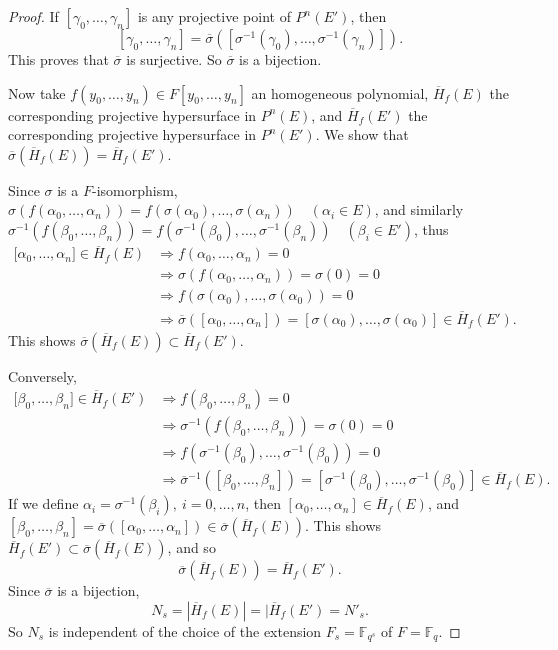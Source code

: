 \documentclass[11pt,a4paper]{article}
\newcommand{\F}{\mathbb{F}}
\begin{document}
\begin{proof}
 If $[\gamma_0,\ldots,\gamma_n] $ is any projective point of $P^n(E')$, then 
 $$[\gamma_0,\ldots,\gamma_n] = \overline{\sigma}([\sigma^{-1}(\gamma_0),\ldots,\sigma^{-1}(\gamma_n)]).$$ This proves that $\overline{\sigma}$ is surjective. So $\overline{\sigma}$ is a bijection.
 
 Now take $f(y_0,\ldots,y_n)\in F[y_0,\ldots,y_n]$ an homogeneous polynomial, $\overline{H}_f(E)$ the corresponding projective hypersurface in $P^n(E)$, and $\overline{H}_f(E')$  the corresponding projective hypersurface in $P^n(E')$. We show that $\overline{\sigma}(\overline{H}_f(E)) = \overline{H}_f(E')$.
 
 Since $\sigma$ is a $F$-isomorphism, $\sigma(f(\alpha_0,\ldots,\alpha_n)) = f(\sigma(\alpha_0),\ldots,\sigma(\alpha_n))\quad (\alpha_i \in E)$, and similarly $\sigma^{-1}(f(\beta_0,\ldots,\beta_n)) = f(\sigma^{-1} (\beta_0),\ldots, \sigma^{-1}(\beta_n))\quad  (\beta_i \in E')$, thus
 \begin{align*}
 {[}\alpha_0,\ldots,\alpha_n{]} \in  \overline{H}_f(E)
 &\Rightarrow f(\alpha_0,\ldots,\alpha_n) = 0 \\
 &\Rightarrow \sigma(f(\alpha_0,\ldots,\alpha_n)) = \sigma(0) = 0\\
 & \Rightarrow f(\sigma(\alpha_0),\ldots,\sigma(\alpha_0)) = 0\\
 &\Rightarrow \overline{\sigma}([\alpha_0,\ldots,\alpha_n]) = [\sigma(\alpha_0),\ldots,\sigma(\alpha_0)] \in \overline{H}_f(E').
\end{align*}
This shows $\overline{\sigma}(\overline{H}_f(E)) \subset \overline{H}_f(E')$.

Conversely, 
 \begin{align*}
 {[}\beta_0,\ldots,\beta_n{]} \in  \overline{H}_f(E')
 &\Rightarrow f(\beta_0,\ldots,\beta_n) = 0 \\
 &\Rightarrow \sigma^{-1}(f(\beta_0,\ldots,\beta_n)) = \sigma(0) = 0\\
 & \Rightarrow f(\sigma^{-1}(\beta_0),\ldots,\sigma^{-1}(\beta_0)) = 0\\
 &\Rightarrow \overline{\sigma}^{-1}([\beta_0,\ldots,\beta_n]) = [\sigma^{-1}(\beta_0),\ldots,\sigma^{-1}(\beta_0)] \in \overline{H}_f(E).
\end{align*}
If we define $\alpha_i = \sigma^{-1}(\beta_i),\ i=0,\ldots,n$, then $[\alpha_0,\ldots,\alpha_n] \in \overline{H}_f(E)$, and $[\beta_0,\ldots,\beta_n] = \overline{\sigma}([\alpha_0,\ldots,\alpha_n]) \in \overline{\sigma}(\overline{H}_f(E))$. This shows $ \overline{H}_f(E') \subset \overline{\sigma}(\overline{H}_f(E))$, and so
$$\overline{\sigma}(\overline{H}_f(E)) = \overline{H}_f(E').$$
Since $\overline{\sigma}$ is a bijection,
$$N_s = |\overline{H}_f(E)| = |\overline{H}_f(E') = N'_s.$$
So $N_s$ is independent of the choice of the extension $F_s = \F_{q^s}$ of $F = \F_q$.
\end{proof}
\end{document}
